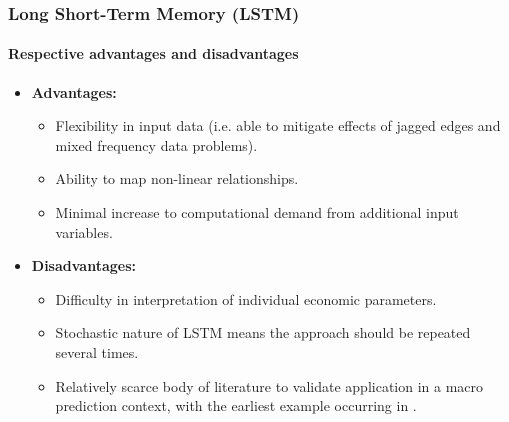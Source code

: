 \begin{frame}
    \frametitle{Long Short-Term Memory (LSTM)}
    \framesubtitle{Respective advantages and disadvantages} 
\begin{itemize}
    \item \textbf{Advantages:} 
    \begin{itemize}
        \item Flexibility in input data (i.e. able to mitigate effects of jagged edges and mixed frequency data problems).
        \item Ability to map non-linear relationships. 
        \item Minimal increase to computational demand from additional input variables. 
    \end{itemize}
\end{itemize}
\vspace{5mm}
 \begin{itemize}
     \item \textbf{Disadvantages:}
     \begin{itemize}
         \item Difficulty in interpretation of individual economic parameters. 
         \item Stochastic nature of LSTM means the approach should be repeated several times.  
         \item Relatively scarce body of literature to validate application in a macro prediction context, with the earliest example occurring in \parencite{kurihara_fukushima_2019}. 
     \end{itemize}
 \end{itemize}
    






\end{frame}    